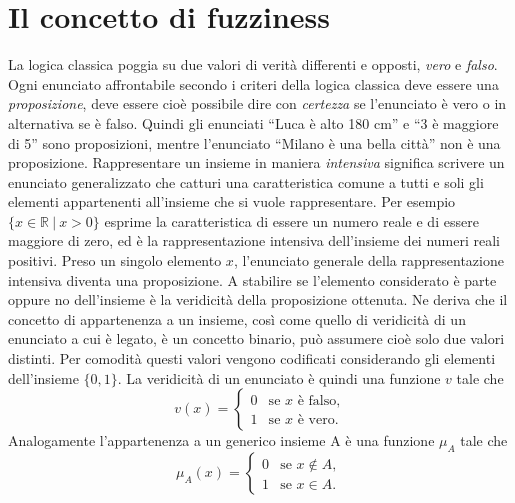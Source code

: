 \documentclass [11pt,a4paper,twoside,openright] {book}
\begin{document}
\section{Il concetto di fuzziness}
La logica classica poggia su due valori di verità differenti e opposti, \textit{vero} e \textit{falso}. Ogni enunciato affrontabile secondo i criteri della logica classica deve essere una \textit{proposizione}, deve essere cioè possibile dire con \textit{certezza} se l'enunciato è vero o in alternativa se è falso. Quindi gli enunciati ``Luca è alto 180 cm'' e ``3 è maggiore di 5'' sono proposizioni, mentre l'enunciato ``Milano è una bella città'' non è una proposizione. Rappresentare un insieme in maniera \textit{intensiva} significa scrivere un enunciato generalizzato che catturi una caratteristica comune a tutti e soli gli elementi appartenenti all'insieme che si vuole rappresentare. Per esempio $\lbrace x \in \mathbb{R} \: | \: x>0 \rbrace$ esprime la caratteristica di essere un numero reale e di essere maggiore di zero, ed è la rappresentazione intensiva dell'insieme dei numeri reali positivi. Preso un singolo elemento $x$, l'enunciato generale della rappresentazione intensiva diventa una proposizione. A stabilire se l'elemento considerato è parte oppure no dell'insieme è la veridicità della proposizione ottenuta. Ne deriva che il concetto di appartenenza a un insieme, così come quello di veridicità di un enunciato a cui è legato, è un concetto binario, può assumere cioè solo due valori distinti. Per comodità questi valori vengono codificati considerando gli elementi dell'insieme $\lbrace 0, 1 \rbrace$. La veridicità di un enunciato è quindi una funzione $v$ tale che
\[
v(x)=
\begin{cases}
0 & \text{se } x \text{ è falso,} \\
1 & \text{se } x \text{ è vero.}
\end{cases}
\]
Analogamente l'appartenenza a un generico insieme A è una funzione $\mu_{A}$ tale che
\[
\mu_{A}(x)=
\begin{cases}
0 & \text{se } x \notin A ,\\
1 & \text{se } x \in A.
\end{cases}
\]
\end{document}
